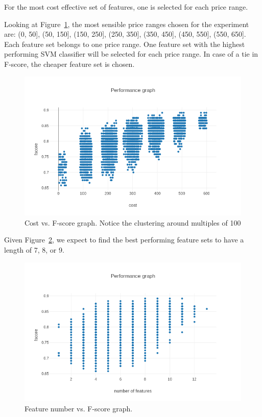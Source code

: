 \documentclass[conference]{IEEEtran}
\begin{document}
	For the most cost effective set of features, one is selected for each price range.

	Looking at Figure~\ref{fig:cost_graph}, the most sensible price ranges chosen for the experiment are: (0, 50], (50, 150], (150, 250], (250, 350], (350, 450], (450, 550], (550, 650].
	Each feature set belongs to one price range. One feature set with the highest performing SVM classifier will be selected for each price range.
	In case of a tie in F-score, the cheaper feature set is chosen.

	\begin{figure}[h]
		\centering
		\includegraphics{cost_vs_fscore.png}
		\caption{Cost vs. F-score graph. Notice the clustering around multiples of 100}
		\label{fig:cost_graph}
	\end{figure}

	Given Figure~\ref{fig:feat_graph}, we expect to find the best performing
	feature sets to have a length of 7, 8, or 9.

	\begin{figure}[h]
		\centering
		\includegraphics{features_vs_fscore.png}
		\caption{Feature number vs. F-score graph.}
		\label{fig:feat_graph}
	\end{figure}
\end{document}
